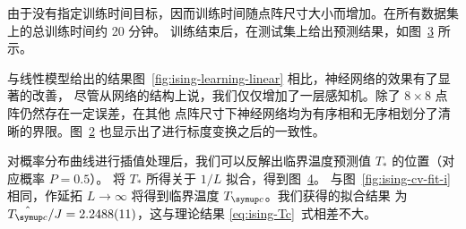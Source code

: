 由于没有指定训练时间目标，因而训练时间随点阵尺寸大小而增加。在所有数据集上的总训练时间约 20 分钟。
训练结束后，在测试集上给出预测结果，如图~\ref{fig:ising-learning-net-total} 所示。

\begin{figure}[htb]
  \centering
  \begin{subfigure}[b]{0.47\textwidth}
    \centering
    \label{fig:ising-learning-net}
  \end{subfigure}
  \begin{subfigure}[b]{0.47\textwidth}
    \centering
    \label{fig:ising-learning-net-scaled}
  \end{subfigure}
  \caption{}
  \label{fig:ising-learning-net-total}
\end{figure}

与线性模型给出的结果图~\ref{fig:ising-learning-linear} 相比，神经网络的效果有了显著的改善，
尽管从网络的结构上说，我们仅仅增加了一层感知机。除了 $8 \times 8$ 点阵仍然存在一定误差，在其他
点阵尺寸下神经网络均为有序相和无序相划分了清晰的界限。图~\ref{fig:ising-learning-net-scaled}
也显示出了进行标度变换之后的一致性。

\begin{figure}[htb]
  \centering
  \caption{}
  \label{fig:ising-learning-net-fit}
\end{figure}

对概率分布曲线进行插值处理后，我们可以反解出临界温度预测值 $T_*$ 的位置（对应概率 $P=0.5$）。
将 $T_*$ 所得关于 $1/L$ 拟合，得到图~\ref{fig:ising-learning-net-fit}。
与图~\ref{fig:ising-cv-fit-i} 相同，作延拓 $L\to\infty$ 将得到临界温度 $\Tc$。我们获得的拟合结果
为 $\hat{\Tc}/J=\num{2.2488(11)}$，这与理论结果 \eqref{eq:ising-Tc}~式相差不大。
